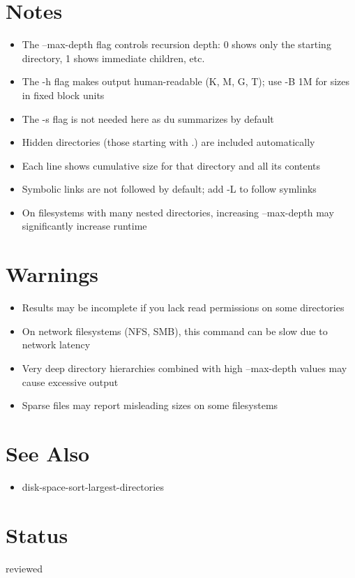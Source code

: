 \documentclass{article}
\begin{document}
\section*{Notes}
\begin{itemize}
  \item The --max-depth flag controls recursion depth: 0 shows only the starting directory, 1 shows immediate children, etc.
  \item The -h flag makes output human-readable (K, M, G, T); use -B 1M for sizes in fixed block units
  \item The -s flag is not needed here as du summarizes by default
  \item Hidden directories (those starting with .) are included automatically
  \item Each line shows cumulative size for that directory and all its contents
  \item Symbolic links are not followed by default; add -L to follow symlinks
  \item On filesystems with many nested directories, increasing --max-depth may significantly increase runtime
\end{itemize}

\section*{Warnings}
\begin{itemize}
  \item Results may be incomplete if you lack read permissions on some directories
  \item On network filesystems (NFS, SMB), this command can be slow due to network latency
  \item Very deep directory hierarchies combined with high --max-depth values may cause excessive output
  \item Sparse files may report misleading sizes on some filesystems
\end{itemize}

\section*{See Also}
\begin{itemize}
  \item disk-space-sort-largest-directories
\end{itemize}

\section*{Status}
reviewed
\end{document}
